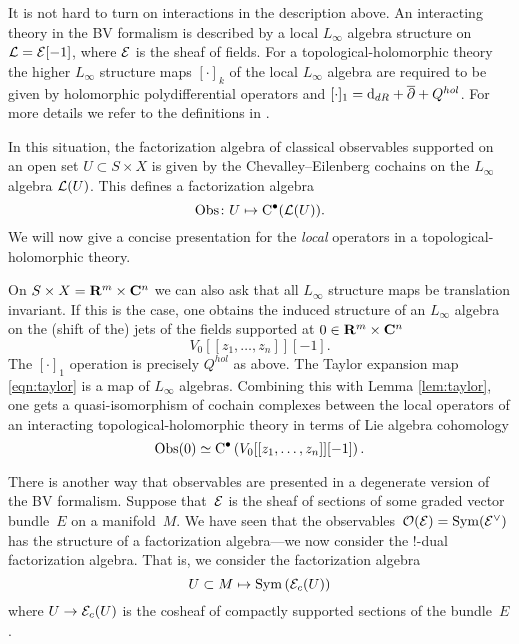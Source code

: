 \parsec[s:interaction]

It is not hard to turn on interactions in the description above. 
An interacting theory in the BV formalism is described by a local $L_\infty$ algebra structure on $\mathcal L = \mathcal E[-1]$, where $\mathcal E$ is the sheaf of fields.
For a topological-holomorphic theory the higher $L_\infty$ structure maps $[\cdot]_k$ of the local $L_\infty$ algebra are required to be given by holomorphic polydifferential operators and $[\cdot]_1 = {\rm d}_{dR} + \overline{\partial} + Q^{hol}$.  
For more details we refer to the definitions in \cite{GRWthf}.

In this situation, the factorization algebra of classical observables supported on an open set $U \subset S \times X$ is given by the Chevalley--Eilenberg cochains on the $L_\infty$ algebra $\mathcal L(U)$. 
This defines a factorization algebra 
\[
\operatorname{Obs} \colon U \mapsto {\rm C}^\bullet(\mathcal L(U)) .
\]
We will now give a concise presentation for the {\em local} operators in a topological-holomorphic theory. 

On $S \times X = \mathbf{R}^m \times \mathbf{C}^n$ we can also ask that all $L_\infty$ structure maps be translation invariant. 
If this is the case, one obtains the induced structure of an $L_\infty$ algebra on the (shift of the) jets of the fields supported at $0 \in \mathbf{R}^m \times \mathbf{C}^n$
\[
V_0 [[z_1,\ldots,z_n]] [-1] .
\]
The $[\cdot]_1$ operation is precisely $Q^{hol}$ as above.
The Taylor expansion map \eqref{eqn:taylor} is a map of $L_\infty$ algebras. 
Combining this with Lemma \ref{lem:taylor}, one gets a quasi-isomorphism of cochain complexes between the local operators of an interacting topological-holomorphic theory in terms of Lie algebra cohomology
\[
\operatorname{Obs}(0) \simeq {\rm C}^\bullet\left(V_0[[z_1,\ldots,z_n]][-1]\right) .
\]


\parsec[s:envelope]

There is another way that observables are presented in a degenerate version of the BV formalism.
Suppose that~$\mathcal E$ is the sheaf of sections of some graded vector bundle~$E$ on a manifold~$M$.
We have seen that the observables~$\mathcal O(\mathcal E) = \operatorname{Sym}(\mathcal E^\vee)$ has the structure of a factorization algebra---we now consider the $!$-dual factorization algebra.
That is, we consider the factorization algebra 
\[
U \subset M \mapsto \operatorname{Sym} \left(\mathcal E_c(U) \right) 
\]
where $U \to \mathcal E_c(U)$ is the cosheaf of compactly supported sections of the bundle~$E$.

